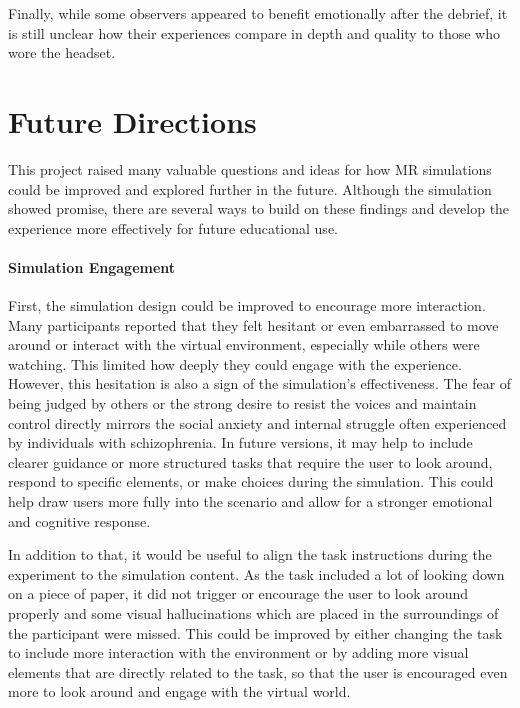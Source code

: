 \vspace{1em}

Finally, while some observers appeared to benefit emotionally after the debrief, it is still unclear how their experiences compare in depth and quality to those who wore the headset. 

\section{Future Directions}

This project raised many valuable questions and ideas for how MR simulations could be improved and explored further in the future. Although the simulation showed promise, there are several ways to build on these findings and develop the experience more effectively for future educational use.

\paragraph{Simulation Engagement} First, the simulation design could be improved to encourage more interaction. Many participants reported that they felt hesitant or even embarrassed to move around or interact with the virtual environment, especially while others were watching. This limited how deeply they could engage with the experience. However, this hesitation is also a sign of the simulation's effectiveness. The fear of being judged by others or the strong desire to resist the voices and maintain control directly mirrors the social anxiety and internal struggle often experienced by individuals with schizophrenia.
In future versions, it may help to include clearer guidance or more structured tasks that require the user to look around, respond to specific elements, or make choices during the simulation. This could help draw users more fully into the scenario and allow for a stronger emotional and cognitive response.

\vspace{1em}

In addition to that, it would be useful to align the task instructions during the experiment to the simulation content. As the task included a lot of looking down on a piece of paper, it did not trigger or encourage the user to look around properly and some visual hallucinations which are placed in the surroundings of the participant were missed. This could be improved by either changing the task to include more interaction with the environment or by adding more visual elements that are directly related to the task, so that the user is encouraged even more to look around and engage with the virtual world.

